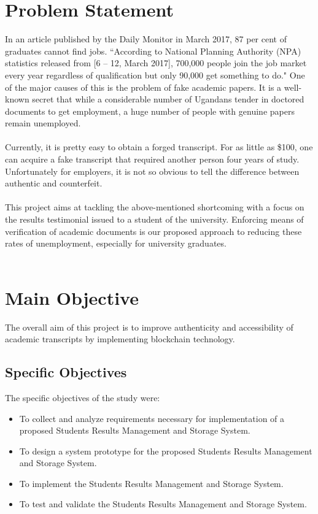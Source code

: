\section{Problem Statement}
In an article published by the Daily Monitor in March 2017, 87 per cent of graduates cannot find jobs. ``According to National Planning Authority (NPA) statistics released from [6 – 12, March 2017], 700,000 people join the job market every year regardless of qualification but only 90,000 get something to do."\cite{art3} 
One of the major causes of this is the problem of fake academic papers. It is a well-known secret that while a considerable number of Ugandans tender in doctored documents to get employment, a huge number of people with
genuine papers remain unemployed.\\\\
Currently, it is pretty easy to obtain a forged transcript. For as little as \$100, one can acquire a fake transcript that required another person four years of study. Unfortunately for employers, it is not so obvious to tell the difference between authentic and counterfeit.\\\\
This project aims at tackling the above-mentioned shortcoming with a focus on the results testimonial issued to a student of the university. Enforcing means of verification of academic documents is our proposed approach to reducing these rates of unemployment, especially for university graduates.\\\\

\section{Main Objective}
The overall aim of this project is to improve authenticity and accessibility of academic transcripts by implementing blockchain technology.
\subsection{Specific Objectives}
The specific objectives of the study were: 
\begin{itemize}
\item To collect and analyze requirements necessary for implementation of a proposed Students Results Management and Storage System.
\item To design a system prototype for the proposed Students Results Management and Storage System.
\item To implement the Students Results Management and Storage System.
\item To test and validate the Students Results Management and Storage System.
\end{itemize}
